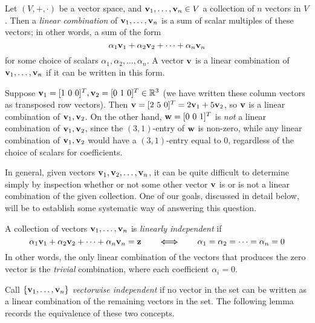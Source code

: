 \documentclass{ximera}
\begin{document}
\begin{definition} Let $(V,+,\cdot)$ be a vector space, and ${\bf v}_1,\dots, {\bf v}_n\in V$ a collection of $n$ vectors in $V$. Then a {\it linear combination} of ${\bf v}_1,\dots,{\bf v}_n$ is a sum of scalar multiples of these vectors; in other words, a sum of the form
\begin{equation}
\alpha_1{\bf v}_1 + \alpha_2{\bf v}_2 +\dots + \alpha_n{\bf v}_n
\end{equation}
for some choice of scalars $\alpha_1,\alpha_2,\dots,\alpha_n$. A vector ${\bf v}$ is a linear combination of ${\bf v}_1,\dots,{\bf v}_n$ if it can be written in this form. 
\end{definition}

\begin{example} Suppose ${\bf v}_1 = [1\ 0\ 0]^T, {\bf v}_2 = [0\ 1\ 0]^T\in\mathbb R^3$ (we have written these column vectors as transposed row vectors). Then ${\bf v} = [2\ 5\ 0]^T = 2{\bf v}_1 + 5{\bf v}_2$, so ${\bf v}$ is a linear combination of ${\bf v}_1,{\bf v}_2$. On the other hand, ${\bf w} = [0\ 0\ 1]^T$ is {\it not} a linear combination of ${\bf v}_1,{\bf v}_2$, since the $(3,1)$-entry of ${\bf w}$ is non-zero, while any linear combination of ${\bf v}_1,{\bf v}_2$ would have a $(3,1)$-entry equal to $0$, regardless of the choice of scalars for coefficients.
\end{example}

In general, given vectors ${\bf v}_1,{\bf v}_2,\dots,{\bf v}_n$, it can be quite difficult to determine simply by inspection whether or not some other vector ${\bf v}$ is or is not a linear combination of the given collection. One of our goals, discussed in detail below, will be to establish some systematic way of answering this question.

\begin{definition} A collection of vectors ${\bf v}_1,\dots,{\bf v}_n$ is {\it linearly independent} if
\begin{equation}
\alpha_1{\bf v}_1 + \alpha_2{\bf v}_2 +\dots + \alpha_n{\bf v}_n = {\bf z}\qquad \boldsymbol{\Longleftrightarrow}\qquad \alpha_1 = \alpha_2 = \dots = \alpha_n = 0
\end{equation}
In other words, the only linear combination of the vectors that produces the zero vector is the {\it trivial} combination, where each coefficient $\alpha_i = 0$.
\end{definition}

Call $\{{\bf v}_1,\dots,{\bf v}_n\}$ {\it vectorwise independent} if no vector in the set can be written as a linear combination of the remaining vectors in the set. The following lemma records the equivalence of these two concepts.
\end{document}
